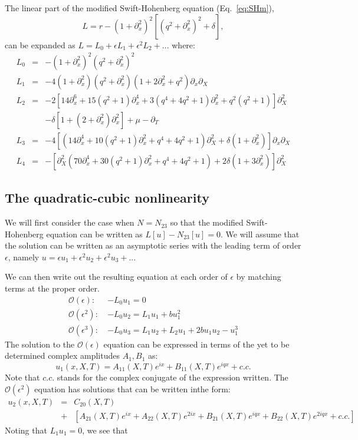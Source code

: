 \documentclass[api,pof,pre,12pt,a4paper]{revtex4-1}
\newcommand{\beqn}{\begin{equation}}
\newcommand{\eeqn}{\end{equation}}
\newcommand{\beqa}{\begin{eqnarray}}
\newcommand{\eeqa}{\end{eqnarray}}
\begin{document}
The linear part of the modified Swift-Hohenberg equation (Eq.~\ref{eq:SHm}), 
\beqn
L= r-\left(1+\partial_{x}^2\right)^2 \left[\left(q^2+\partial_{x}^2\right)^2+\delta \right],
\eeqn
can be expanded as $L=L_0+\epsilon L_1+\epsilon^2 L_2+...$ where:
\beqa
L_0 &=& -\left(1+\partial_x^2\right)^2 \left(q^2+\partial_x^2\right)^2 \\
L_1 &=& -4\left(1+\partial_x^2\right)  \left(q^2+\partial_x^2\right) \left(1+2 \partial_x^2+q^2\right)\partial_x\partial_X \\
L_2 &=&- 2 \left[14 \partial_x^6+15  \left(q^2+1\right)\partial_x^4+3 \left(q^4+4 q^2+1\right) \partial_x^2+q^2\left(q^2+1\right)\right] \partial_X^2\nonumber\\  
& & -\delta \left[1+ \left(2+\partial_x^2\right)\partial_x^2\right] +\mu -\partial_T \\
L_3 &=& -4   \left[ \left(14 \partial_x^4+10  \left(q^2+1\right)\partial_x^2+q^4+ 4 q^2+1\right)\partial_X^2+\delta\left(1 +\partial_x^2\right)\right]\partial_x \partial_X \\
L_4 &=& -\left[\partial_X^2 \left(70 \partial_x^4+30\left(q^2+1\right) \partial_x^2 +q^4 +4 q^2+1\right)+2 \delta\left(1 +3 \partial_x^2 \right) \right] \partial_X^2  
\eeqa

\subsection{The quadratic-cubic nonlinearity}
We will first consider the case when $N=N_{23}$ so that the modified Swift-Hohenberg equation can be written as $L[u]-N_{23}[u]=0$.  We will assume that the solution can be written as an asymptotic series with the leading term of order $\epsilon$, namely $u=\epsilon u_1 + \epsilon^2 u_2 +\epsilon^2 u_3+...$ 

We can then write out the resulting equation at each order of $\epsilon$ by matching terms at the proper order.
\begin{subequations}
\begin{align}
\mathcal{O}(\epsilon): \:  &-L_0 u_1 =0
\label{eq:msh23o1} \\
\mathcal{O}(\epsilon^2): \: &-L_0 u_2 = L_1 u_1 +b u_1^2
\label{eq:msh23o2} \\
\mathcal{O}(\epsilon^3): \:  &-L_0 u_3 = L_1 u_2 +L_2 u_1 + 2b u_1 u_2-u_1^3
\label{eq:msh23o3}
\end{align}
\end{subequations}
The solution to the $\mathcal{O}(\epsilon)$ equation can be expressed in terms of the yet to be determined complex amplitudes $A_1, B_1$ as:
\beqn
u_1(x,X,T)=A_{11}(X,T)e^{i x} +B_{11}(X,T)e^{i q x} +c.c.
\eeqn
Note that $c.c.$ stands for the complex conjugate of the expression written.  The  $\mathcal{O}(\epsilon^2)$ equation has solutions that can be written inthe form:
\beqa
u_2(x,X,T)&=&C_{20}(X,T) \\
&+ &\left[ A_{21}(X,T)e^{i x}+A_{22}(X,T)e^{2 i x} +B_{21}(X,T)e^{i q x} + B_{22}(X,T)e^{2 i q x} +c.c.\right]
\eeqa
Noting that $L_1 u_1=0$, we see that
\end{document}
